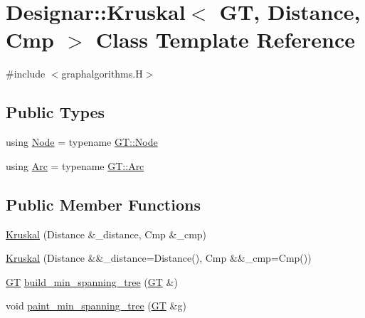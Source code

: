 \hypertarget{class_designar_1_1_kruskal}{}\section{Designar\+:\+:Kruskal$<$ GT, Distance, Cmp $>$ Class Template Reference}
\label{class_designar_1_1_kruskal}


{\ttfamily \#include $<$graphalgorithms.\+H$>$}

\subsection*{Public Types}
\begin{DoxyCompactItemize}
\item 
using \hyperlink{class_designar_1_1_kruskal_ae877bf49a387ddf132cfd824a0d258dd}{Node} = typename \hyperlink{class_designar_1_1_graph_a5dfc7dba9d092ac489c72e40390c37d0}{G\+T\+::\+Node}
\item 
using \hyperlink{class_designar_1_1_kruskal_a90eba06ada80f8b0b010782c15c0e52a}{Arc} = typename \hyperlink{class_designar_1_1_graph_a74c730ef4ce2d20f998d72bd25c2b5bf}{G\+T\+::\+Arc}
\end{DoxyCompactItemize}
\subsection*{Public Member Functions}
\begin{DoxyCompactItemize}
\item 
\hyperlink{class_designar_1_1_kruskal_a930c064f2563fa43125656f6a3646882}{Kruskal} (Distance \&\+\_\+distance, Cmp \&\+\_\+cmp)
\item 
\hyperlink{class_designar_1_1_kruskal_ae1108aacf254cb652fa16a8ba398e685}{Kruskal} (Distance \&\&\+\_\+distance=Distance(), Cmp \&\&\+\_\+cmp=Cmp())
\item 
\hyperlink{demo-buildgraph_8_c_a3001c40d2c31ca87ed96cd7d1334a55e}{GT} \hyperlink{class_designar_1_1_kruskal_ab5641dc38fc6385a0af6a82f8458b15b}{build\+\_\+min\+\_\+spanning\+\_\+tree} (\hyperlink{demo-buildgraph_8_c_a3001c40d2c31ca87ed96cd7d1334a55e}{GT} \&)
\item 
void \hyperlink{class_designar_1_1_kruskal_a2bab9970dc087501a1bf935396174512}{paint\+\_\+min\+\_\+spanning\+\_\+tree} (\hyperlink{demo-buildgraph_8_c_a3001c40d2c31ca87ed96cd7d1334a55e}{GT} \&g)
\end{DoxyCompactItemize}


